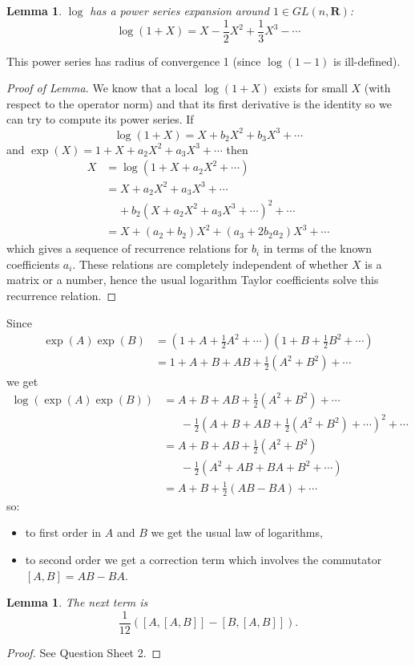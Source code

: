 \documentclass[12pt]{article}
\newcommand{\RR}{\mathbf{R}}
\newtheorem{lma}[thm]{Lemma}
\theoremstyle{definition}
\theoremstyle{check}
\theoremstyle{remark}
\theoremstyle{TheoremNum}
\begin{document}
\begin{lma}
$\log$ has a power series expansion around $1\in GL(n,\RR)$:
\[\log(1+X)=X-\frac{1}{2}X^2+\frac{1}{3}X^3-\cdots\]
\end{lma}
This power series has radius of convergence 1 (since $\log(1-1)$ is ill-defined).
\begin{proof}[Proof of Lemma]
We know that a local $\log(1+X)$ exists for small $X$ (with respect to the operator norm) and that its first derivative is the identity so we can try to compute its power series. If
\[\log(1+X)=X+b_2X^2+b_3X^3+\cdots\]
and $\exp(X)=1+X+a_2X^2+a_3X^3+\cdots$ then
\begin{align*}
X&=\log(1+X+a_2X^2+\cdots)\\
 &=X+a_2X^2+a_3X^3+\cdots\\
 &\ \ \ \ \ +b_2(X+a_2X^2+a_3X^3+\cdots)^2+\cdots\\
 &=X+(a_2+b_2)X^2+(a_3+2b_2a_2)X^3+\cdots
\end{align*}
which gives a sequence of recurrence relations for $b_i$ in terms of the known coefficients $a_i$. These relations are completely independent of whether $X$ is a matrix or a number, hence the usual logarithm Taylor coefficients solve this recurrence relation.
\end{proof}

Since
\begin{align*}
\exp(A)\exp(B)&=\left(1+A+\frac{1}{2}A^2+\cdots\right)\left(1+B+\frac{1}{2}B^2+\cdots\right)\\
&=1+A+B+AB+\frac{1}{2}(A^2+B^2)+\cdots
\end{align*}
we get
\begin{align*}
\log\left(\exp(A)\exp(B)\right)&=A+B+AB+\frac{1}{2}(A^2+B^2)+\cdots\\
&\ \ \ \ \ \ \ -\frac{1}{2}\left(A+B+AB+\frac{1}{2}(A^2+B^2)+\cdots\right)^2+\cdots\\
&=A+B+AB+\frac{1}{2}(A^2+B^2)\\
&\ \ \ \ \ \ \ -\frac{1}{2}(A^2+AB+BA+B^2+\cdots)\\
&=A+B+\frac{1}{2}(AB-BA)+\cdots
\end{align*}
so:
\begin{itemize}
\item to first order in $A$ and $B$ we get the usual law of logarithms,
\item to second order we get a correction term which involves the commutator $[A,B]=AB-BA$.
\end{itemize}

\begin{lma}
The next term is
\[\frac{1}{12}\left([A,[A,B]]-[B,[A,B]]\right).\]
\end{lma}
\begin{proof}
See Question Sheet 2.
\end{proof}
\end{document}
